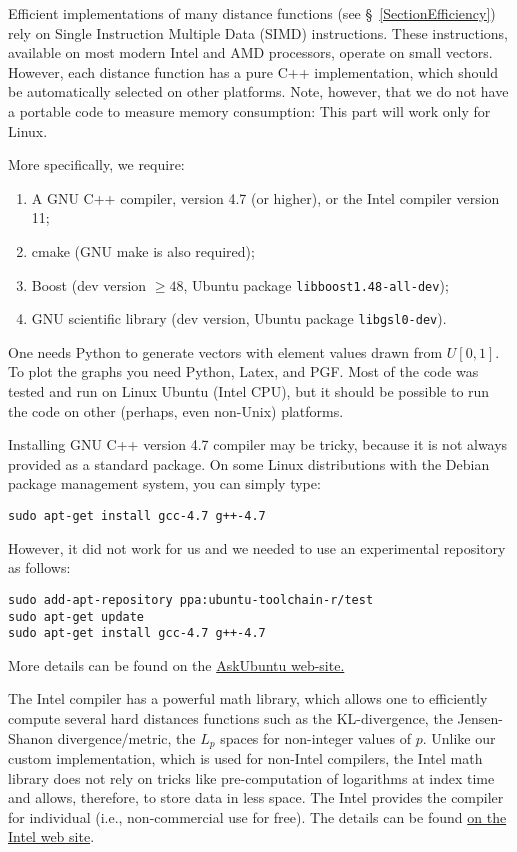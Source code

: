 \documentclass[runningheads,a4paper]{llncs}
\newcommand{\ttt}[1]{\texttt{#1}}
\begin{document}
{Efficient implementations of many distance functions (see \S~\ref{SectionEfficiency})
rely on Single Instruction Multiple Data (SIMD) instructions. 
These instructions, available on most modern Intel and AMD processors, 
operate on small vectors. 
However, each distance function has a pure C++ implementation,
which should be automatically selected on other platforms.
Note, however, that we do not have a portable code to measure memory consumption:
This part will work only for Linux. 

More specifically, we require:
\begin{enumerate}
\item A GNU C++ compiler, version 4.7 (or higher), or the Intel compiler version 11;
\item cmake (GNU make is also required);
\item Boost (dev version $\ge48$, Ubuntu package \ttt{libboost1.48-all-dev});
\item GNU scientific library (dev version, Ubuntu package \ttt{libgsl0-dev}).
\end{enumerate}
One needs Python to generate vectors with element values drawn from $U[0,1]$.
To plot the graphs you need Python, Latex, and PGF. 
Most of the code was tested and run on Linux Ubuntu (Intel CPU), 
but it should be possible to run the code on other (perhaps, even non-Unix) platforms.

Installing GNU C++ version 4.7 compiler may be tricky, because it is not always provided as a standard package.
On some Linux distributions with the Debian package management system, you can simply type:
\begin{verbatim}
sudo apt-get install gcc-4.7 g++-4.7
\end{verbatim}
However, it did not work for us and we needed to use an experimental repository as follows:
\begin{verbatim}
sudo add-apt-repository ppa:ubuntu-toolchain-r/test
sudo apt-get update
sudo apt-get install gcc-4.7 g++-4.7
\end{verbatim}
More details can be found on the \href{http://askubuntu.com/questions/113291/how-do-i-install-gcc-4-7}{AskUbuntu web-site.}

The Intel compiler has a powerful math library, 
which allows one to efficiently compute several hard distances functions
such as the KL-divergence, the Jensen-Shanon divergence/metric, 
the $L_p$ spaces for non-integer values of $p$.
Unlike our custom implementation, which is used for non-Intel compilers,
the Intel math library does not rely on tricks like pre-computation of logarithms at index time and
allows, therefore, to store data in less space. 
The Intel provides the compiler for individual (i.e., non-commercial use for free).
The details can be found \href{http://software.intel.com/en-us/non-commercial-software-development}{on the Intel web site}.


}
\end{document}
